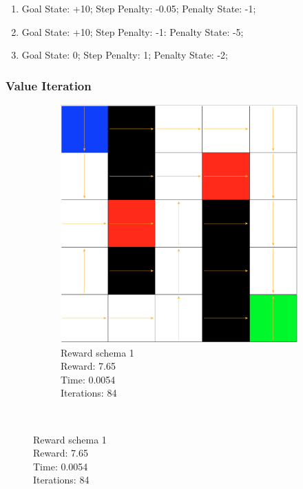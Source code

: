 \documentclass[a4paper,10pt]{article}
\begin{document}
\begin{enumerate}
\item Goal State: +10; Step Penalty: -0.05; Penalty State: -1;
\item Goal State: +10; Step Penalty: -1: Penalty State: -5;
\item Goal State: 0; Step Penalty: 1; Penalty State: -2;
\end{enumerate}

\subsubsection{Value Iteration}
\begin{figure}[h!]
        \centering
        \begin{subfigure}[b]{0.3\textwidth}
                \includegraphics[width=\textwidth]{figures/5x5_viter_r1.png}
                \caption{Reward schema 1\\
                Reward:  7.65\\
                Time:  0.0054\\
                Iterations: 84}
                \label{fig:gull}
        \end{subfigure}%
        ~ %

\end{figure}
\end{document}
